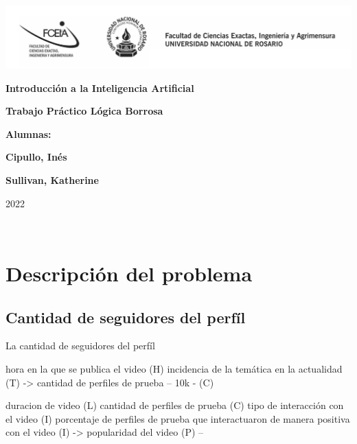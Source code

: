 \documentclass{article}
\begin{document}
\begin{titlepage}
    \hspace{-2.5cm}\includegraphics[scale= 0.48]{header.png}
    \begin{center}
        \vfill
            \noindent\textbf{\Huge Introducción a la Inteligencia Artificial}\par
            \vspace{.5cm}
            \noindent\textbf{\Huge Trabajo Práctico Lógica Borrosa}\par
            \vspace{.5cm}
        \vfill
        \noindent \textbf{\huge Alumnas:}\par
        \vspace{.5cm}
        \noindent \textbf{\Large Cipullo, Inés}\par
        \noindent \textbf{\Large Sullivan, Katherine}\par
 
        \vfill
        \noindent\large 2022
    \end{center}
\end{titlepage}
\ 



\section*{Descripción del problema}

\subsection*{Cantidad de seguidores del perfíl}

La cantidad de seguidores del perfíl

hora en la que se publica el video (H) 
incidencia de la temática en la actualidad (T)
-> cantidad de perfiles de prueba -- 10k - (C)

duracion de video (L)
cantidad de perfiles de prueba (C)
tipo  de interacción con el video (I)
porcentaje de perfiles de prueba que interactuaron de manera positiva con el video (I) 
-> popularidad del video (P) -- 
\end{document}
